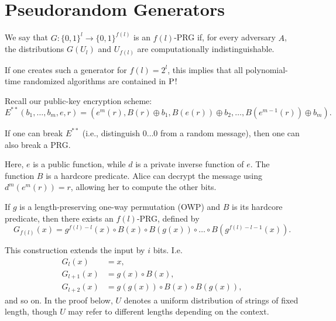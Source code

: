 \section{Pseudorandom Generators}

\begin{definition}
  We say that $G \colon \{0,1\}^l \to \{0,1\}^{f(l)}$ is an $f(l)$-PRG if, for every adversary $A$, the distributions $G(U_l)$ and $U_{f(l)}$ are computationally indistinguishable.
\end{definition}

If one creates such a generator for $f(l) = 2^{l}$, this implies that all polynomial-time randomized algorithms are contained in $\P$!

Recall our public-key encryption scheme:
\[
E^{**}(b_1, \ldots, b_m, e, r) = \left(e^{m}(r), B(r) \oplus b_1, B(e(r)) \oplus b_2, \ldots, B(e^{m - 1}(r)) \oplus b_m\right).
\] 

\begin{theorem}
  If one can break $E^{**}$ (i.e., distinguish $0\ldots0$ from a random message), then one can also break a PRG.
\end{theorem}

Here, $e$ is a public function, while $d$ is a private inverse function of $e$.
The function $B$ is a hardcore predicate.
Alice can decrypt the message using $d^{m}(e^{m}(r)) = r$, allowing her to compute the other bits.

\begin{lemma}
	If $g$ is a length-preserving one-way permutation (OWP) and $B$ is its hardcore predicate, then there exists an $f(l)$-PRG, defined by
	 \[
	  G_{f(l)}(x) = g^{f(l) - l}(x) \circ B(x) \circ B(g(x)) \circ \dots \circ B(g^{f(l) - l - 1}(x)).
	 \]
\end{lemma}
This construction extends the input by $i$ bits.
I.e.
\begin{align*}
    G_l(x) &= x, \\
    G_{l + 1}(x) &= g(x) \circ B(x), \\
    G_{l + 2}(x) &= g(g(x)) \circ B(x) \circ B(g(x)),
\end{align*} and so on.
In the proof below, $U$ denotes a uniform distribution of strings of fixed length, though $U$ may refer to different lengths depending on the context.


